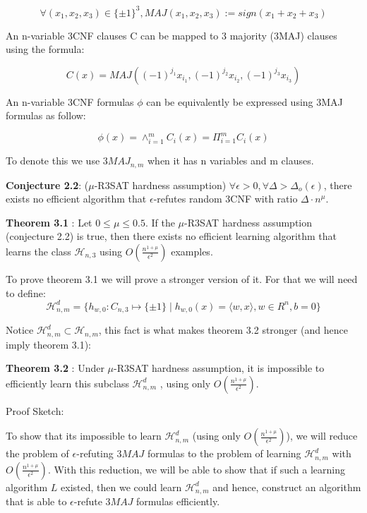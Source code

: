 \documentclass[12pt]{report}
\begin{document}
$$\forall (x_1, x_2, x_3) \in \{ \pm 1 \}^3, MAJ(x_1, x_2, x_3 ) := sign(x_1 + x_2 + x_3 )$$

An n-variable 3CNF clauses C can be mapped to 3 majority (3MAJ) clauses using the formula:

$$ C(x) = MAJ( (-1)^{j_1}x_{i_1} , (-1)^{j_2}x_{i_2} , (-1)^{j_3}x_{i_3} )$$

An n-variable 3CNF formulas $\phi$ can be equivalently be expressed using 3MAJ formulas as follow:

$$ \phi(x) = \wedge^m_{i=1} C_{i}(x)  = \Pi^m_{i=1} C_{i}(x) $$

To denote this we use $3MAJ_{n,m}$ when it has n variables and m clauses.

\textbf{Conjecture 2.2}: ($\mu$-R3SAT hardness assumption) $\forall \epsilon > 0, \forall \Delta > \Delta_o(\epsilon) $, there exists no efficient algorithm that $\epsilon$-refutes random 3CNF with ratio $\Delta \cdot n^{\mu}$.
 
\textbf{Theorem 3.1 }: Let $0 \leq \mu \leq 0.5$. If the $\mu$-R3SAT hardness assumption (conjecture 2.2) is true, then there exists no efficient learning algorithm that learns the class $\mathcal{H}_{n,3}$ using $O \left(  \frac{n^{1 + \mu }}{\epsilon^2} \right)$ examples.

To prove theorem 3.1 we will prove a stronger version of it. For that we will need to define:
$$ \mathcal{H}^d_{n,m} = \{ h_{w,0} : C_{n, 3} \mapsto \{ \pm 1\} \mid h_{w,0}(x) = \langle w, x \rangle, w \in R^n, b = 0 \}$$

Notice $\mathcal{H}^d_{n,m} \subset \mathcal{H}_{n,m}$, this fact is what makes theorem 3.2 stronger (and hence imply theorem 3.1):

\textbf{Theorem 3.2 }: Under $\mu$-R3SAT hardness assumption, it is impossible to efficiently learn this subclass  $\mathcal{H}^d_{n,m}$ , using only $O \left(  \frac{n^{1 + \mu }}{\epsilon^2} \right)$.

Proof Sketch:

To show that its impossible to learn $\mathcal{H}^d_{n,m}$ (using only $O \left(  \frac{n^{1 + \mu }}{\epsilon^2} \right)$), we will reduce the problem of $\epsilon$-refuting $3MAJ$ formulas to the problem of learning $\mathcal{H}^d_{n,m}$ with $O \left(  \frac{n^{1 + \mu }}{\epsilon^2} \right)$. With this reduction, we will be able to show that if such a learning algorithm $L$ existed, then we could learn $\mathcal{H}^d_{n,m}$ and hence, construct an algorithm that is able to $\epsilon$-refute $3MAJ$ formulas efficiently.
\end{document}
